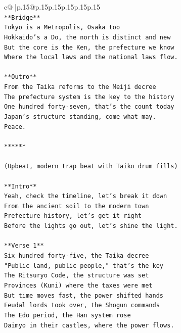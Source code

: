 \documentclass{article}
\begin{document}
{\begin{supertabular}{c@{$\;$}|p{.15\linewidth}@{}p{.15\linewidth}p{.15\linewidth}p{.15\linewidth}p{.15\linewidth}p{.15\linewidth}}
{{{\\ 
\texttt{**Bridge**} \\
\texttt{Tokyo is a Metropolis, Osaka too} \\
\texttt{Hokkaido's a Do, the north is distinct and new} \\
\texttt{But the core is the Ken, the prefecture we know} \\
\texttt{Where the local laws and the national laws flow.} \\
\\ 
\texttt{**Outro**} \\
\texttt{From the Taika reforms to the Meiji decree} \\
\texttt{The prefecture system is the key to the history} \\
\texttt{One hundred forty{-}seven, that's the count today} \\
\texttt{Japan's structure standing, come what may.} \\
\texttt{Peace.} \\
\\ 
\texttt{******} \\
\\ 
\texttt{(Upbeat, modern trap beat with Taiko drum fills)} \\
\\ 
\texttt{**Intro**} \\
\texttt{Yeah, check the timeline, let's break it down} \\
\texttt{From the ancient soil to the modern town} \\
\texttt{Prefecture history, let's get it right} \\
\texttt{Before the lights go out, let's shine the light.} \\
\\ 
\texttt{**Verse 1**} \\
\texttt{Six hundred forty{-}five, the Taika decree} \\
\texttt{"Public land, public people," that's the key} \\
\texttt{The Ritsuryo Code, the structure was set} \\
\texttt{Provinces (Kuni) where the taxes were met} \\
\texttt{But time moves fast, the power shifted hands} \\
\texttt{Feudal lords took over, the Shogun commands} \\
\texttt{The Edo period, the Han system rose} \\
\texttt{Daimyo in their castles, where the power flows.} \\
}}}
\end{supertabular}}
\end{document}
